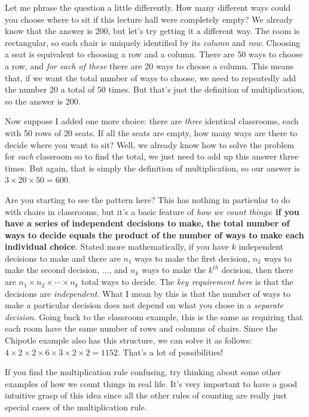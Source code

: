 \documentclass[12pt]{article}
\begin{document}
Let me phrase the question a little differently.
How many different ways could you choose where to sit if this lecture hall were completely empty?
We already know that the answer is 200, but let's try getting it a different way.
The room is rectangular, so each chair is uniquely identified by its \emph{column} and \emph{row}.
Choosing a seat is equivalent to choosing a row and a column.
There are 50 ways to choose a row, and \emph{for each of these} there are 20 ways to choose a column.
This means that, if we want the total number of ways to choose, we need to repeatedly add the number 20 a total of 50 times.
But that's just the definition of multiplication, so the answer is 200.

Now suppose I added one more choice: there are \emph{three} identical classrooms, each with 50 rows of 20 seats.
If all the seats are empty, how many ways are there to decide where you want to sit?
Well, we already know how to solve the problem for \emph{each} classroom so to find the total, we just need to add up this answer three times.
But again, that is simply the definition of multiplication, so our answer is $3 \times 20 \times 50 = 600$.

Are you starting to see the pattern here?
This has nothing in particular to do with chairs in classrooms, but it's a basic feature of \emph{how we count things}: \textbf{if you have a series of independent decisions to make, the total number of ways to decide equals the product of the number of ways to make each individual choice}.
Stated more mathematically, if you have $k$ independent decisions to make and there are $n_1$ ways to make the first decision, $n_2$ ways to make the second decision, $\hdots$, and $n_k$ ways to make the $k^{th}$ decision, then there are $n_1 \times n_2 \times \cdots \times n_k$ total ways to decide.
The \emph{key requirement here} is that the decisions are \emph{independent}.
What I mean by this is that the number of ways to make a particular decision does not depend on what you chose in a \emph{separate decision}.
Going back to the classroom example, this is the same as requiring that each room have the same number of rows and columns of chairs.
Since the Chipotle example also has this structure, we can solve it as follows: $4 \times 2 \times 2 \times 6 \times 3 \times 2 \times 2 = 1152$.
That's a lot of possibilities!

If you find the multiplication rule confusing, try thinking about some other examples of how we count things in real life.
It's very important to have a good intuitive grasp of this idea since all the other rules of counting are really just special cases of the multiplication rule.
\end{document}

